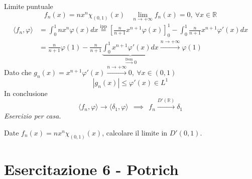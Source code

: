 Limite puntuale
\begin{equation*}
f_{n} (x)=nx^{n} \chi _{(0,1)} (x)\ \ \ \ \lim\limits _{n\rightarrow +\infty } f_{n}( x) =0,\ \forall x\in \mathbb{R}
\end{equation*}
\begin{equation*}
\begin{aligned}
\langle f_{n} ,\varphi \rangle  & =\int ^{1}_{0} nx^{n} \varphi ( x) dx\overset{\text{ipp}}{=}\left[\frac{n}{n+1} x^{n+1} \varphi ( x)\right]^{1}_{0} -\int ^{1}_{0}\frac{n}{n+1} x^{n+1} \varphi '( x) dx\\
 & =\frac{n}{n+1} \varphi ( 1) -\frac{n}{n+1}\underbrace{\int ^{1}_{0} x^{n+1} \varphi '( x) dx}_{\xrightarrow{\text{Dom}} 0}\xrightarrow{n\rightarrow +\infty } \varphi ( 1)
\end{aligned}
\end{equation*}
Dato che $g_{n}( x) =x^{n+1} \varphi '( x)\xrightarrow{n\rightarrow +\infty } 0,\ \forall x\in ( 0,1)$
\begin{equation*}
| g_{n}( x)| \leqslant \varphi '( x) \in L^{1}
\end{equation*}
In conclusione
\begin{equation*}
\langle f_{n} ,\varphi \rangle \rightarrow \langle \delta _{1} ,\varphi \rangle \ \ \implies \ \ f_{n}\xrightarrow{D'(\mathbb{R})} \delta _{1}
\end{equation*}
\textit{Esercizio per casa.}

Date $f_{n}( x) =nx^{n} \chi _{( 0,1)}( x)$, calcolare il limite in $D'( 0,1)$.
\chapter{Esercitazione 6 - Potrich}
\ParteEsercizi
\Esercizio{}

